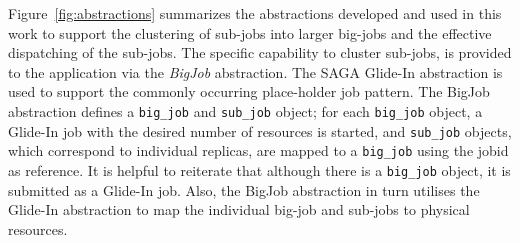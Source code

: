 \documentclass{rspublic}
\newcommand{\jhanote}[1]{ {\textcolor{red} { ***SJ: #1 }}}
\newcommand{\jhanote}[1]{}
\newcommand{\replicaagent}[1]{Replica-Agent }
\newcommand{\remanager}[1]{RE-Manager }
\begin{document}
Figure~\ref{fig:abstractions} summarizes the abstractions developed
and used in this work to support the clustering of sub-jobs into 
larger big-jobs and the effective dispatching of the sub-jobs.  The
specific capability to cluster sub-jobs, is provided to the
application via the \emph{BigJob} abstraction. 
The SAGA Glide-In abstraction is used to
support the commonly occurring place-holder job pattern.
The BigJob abstraction defines a \texttt{big\_job}
and \texttt{sub\_job} object; for each \texttt{big\_job}
object, a Glide-In job with the desired number of resources is
started, and \texttt{sub\_job} objects, which correspond to
individual replicas, are mapped to a \texttt{big\_job} using the jobid
as reference. It is helpful to reiterate that although there is a
\texttt{big\_job} object, it is submitted as a Glide-In job. Also, the
BigJob abstraction in turn utilises the Glide-In abstraction to map the
individual big-job and sub-jobs to physical resources.

    
\end{document}
